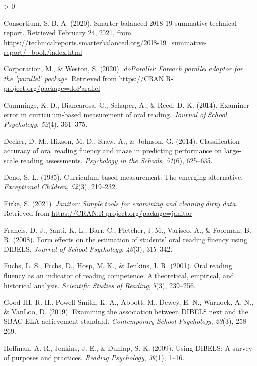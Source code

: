 \documentclass[
  english,
  man, fleqn, noextraspace]{apa6}
\newlength{\cslhangindent}
\newenvironment{CSLReferences}[2] %
 {%
  \setlength{\parindent}{0pt}
  \ifodd #1 \everypar{\setlength{\hangindent}{\cslhangindent}}\ignorespaces\fi
  \ifnum #2 > 0
  \setlength{\parskip}{#2\baselineskip}
  \fi
 }%
 {}
\begin{document}
\begin{CSLReferences}{1}{0}
\leavevmode\hypertarget{ref-sbac}{}%
Consortium, S. B. A. (2020). Smarter balanced 2018-19 summative technical report. Retrieved February 24, 2021, from \url{https://technicalreports.smarterbalanced.org/2018-19_summative-report/_book/index.html}

\leavevmode\hypertarget{ref-R-doParallel}{}%
Corporation, M., \& Weston, S. (2020). \emph{doParallel: Foreach parallel adaptor for the 'parallel' package}. Retrieved from \url{https://CRAN.R-project.org/package=doParallel}

\leavevmode\hypertarget{ref-cummings2014}{}%
Cummings, K. D., Biancarosa, G., Schaper, A., \& Reed, D. K. (2014). Examiner error in curriculum-based measurement of oral reading. \emph{Journal of School Psychology}, \emph{52}(4), 361--375.

\leavevmode\hypertarget{ref-decker2014}{}%
Decker, D. M., Hixson, M. D., Shaw, A., \& Johnson, G. (2014). Classification accuracy of oral reading fluency and maze in predicting performance on large-scale reading assessments. \emph{Psychology in the Schools}, \emph{51}(6), 625--635.

\leavevmode\hypertarget{ref-deno1985}{}%
Deno, S. L. (1985). Curriculum-based measurement: The emerging alternative. \emph{Exceptional Children}, \emph{52}(3), 219--232.

\leavevmode\hypertarget{ref-R-janitor}{}%
Firke, S. (2021). \emph{Janitor: Simple tools for examining and cleaning dirty data}. Retrieved from \url{https://CRAN.R-project.org/package=janitor}

\leavevmode\hypertarget{ref-francis2008}{}%
Francis, D. J., Santi, K. L., Barr, C., Fletcher, J. M., Varisco, A., \& Foorman, B. R. (2008). Form effects on the estimation of students' oral reading fluency using DIBELS. \emph{Journal of School Psychology}, \emph{46}(3), 315--342.

\leavevmode\hypertarget{ref-fuchs2001}{}%
Fuchs, L. S., Fuchs, D., Hosp, M. K., \& Jenkins, J. R. (2001). Oral reading fluency as an indicator of reading competence: A theoretical, empirical, and historical analysis. \emph{Scientific Studies of Reading}, \emph{5}(3), 239--256.

\leavevmode\hypertarget{ref-good2019}{}%
Good III, R. H., Powell-Smith, K. A., Abbott, M., Dewey, E. N., Warnock, A. N., \& VanLoo, D. (2019). Examining the association between DIBELS next{{}} and the SBAC ELA achievement standard. \emph{Contemporary School Psychology}, \emph{23}(3), 258--269.

\leavevmode\hypertarget{ref-hoffman2009}{}%
Hoffman, A. R., Jenkins, J. E., \& Dunlap, S. K. (2009). Using DIBELS: A survey of purposes and practices. \emph{Reading Psychology}, \emph{30}(1), 1--16.


\end{CSLReferences}
\end{document}
